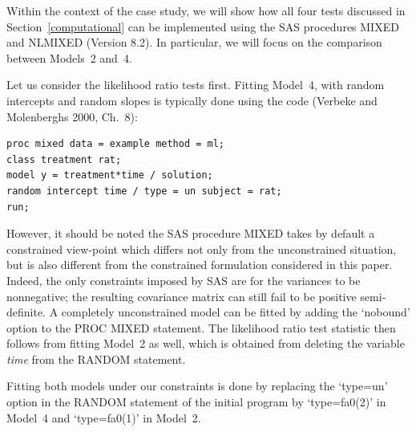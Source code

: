 \documentclass[useAMS,usenatbib,referee]{biom}
\begin{document}
Within the context of the case study, we will show how all four tests
discussed in Section~\ref{computational} can be implemented using the
SAS procedures MIXED and NLMIXED (Version 8.2). In particular, we will
focus on the comparison between Models~2 and~4.

Let us consider the likelihood ratio tests first.  Fitting Model~4,
with random intercepts and random slopes is typically done using the
code (Verbeke and Molenberghs 2000, Ch.~8):
\begin{verbatim}
proc mixed data = example method = ml;
class treatment rat;
model y = treatment*time / solution;
random intercept time / type = un subject = rat;
run;
\end{verbatim}
However, it should be noted the SAS procedure MIXED takes by default a
constrained view-point which differs not only from the unconstrained
situation, but is also different from the constrained formulation
considered in this paper. Indeed, the only constraints imposed by SAS
are for the variances to be nonnegative; the resulting covariance
matrix can still fail to be positive semi-definite. A completely
unconstrained model can be fitted by adding the `nobound' option to
the PROC MIXED statement. The likelihood ratio test statistic then
follows from fitting Model~2 as well, which is obtained from deleting
the variable {\em time\/} from the RANDOM statement.

Fitting both models under our constraints is done by replacing the
`type=un' option in the RANDOM statement of the initial program by
`type=fa0(2)' in Model~4 and `type=fa0(1)' in Model~2.
\end{document}
